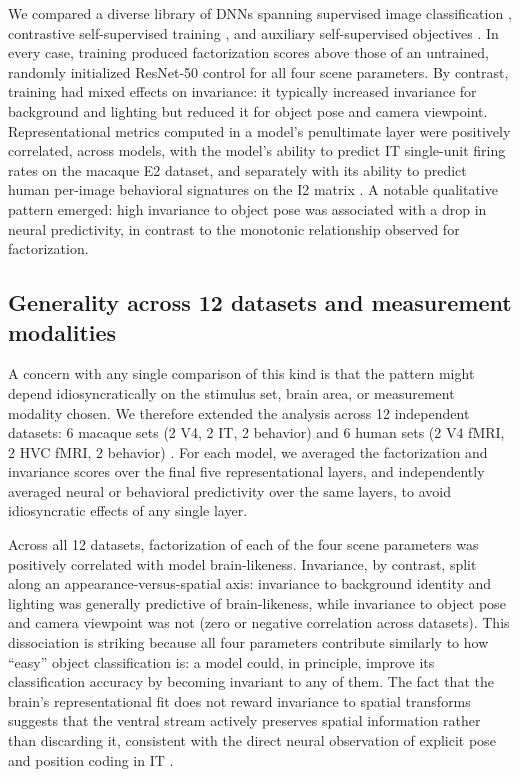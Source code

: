\documentclass[11pt]{article}
\begin{document}
We compared a diverse library of DNNs spanning supervised image
classification \citep{krizhevsky2012imagenet, he2016deep}, contrastive
self-supervised training \citep{chen2020simple, he2020momentum}, and
auxiliary self-supervised objectives \citep{zhuang2021unsupervised}. In
every case, training produced factorization scores above those of an
untrained, randomly initialized ResNet-50 control for all four scene
parameters. By contrast, training had mixed effects on invariance: it
typically increased invariance for background and lighting but reduced it
for object pose and camera viewpoint. Representational metrics computed in
a model's penultimate layer were positively correlated, across models, with
the model's ability to predict IT single-unit firing rates on the macaque E2
dataset, and separately with its ability to predict human per-image
behavioral signatures on the I2 matrix
\citep{rajalingham2018large}. A notable qualitative pattern emerged: high
invariance to object pose was associated with a drop in neural predictivity,
in contrast to the monotonic relationship observed for factorization.

\subsection{Generality across 12 datasets and measurement modalities}

A concern with any single comparison of this kind is that the pattern might
depend idiosyncratically on the stimulus set, brain area, or measurement
modality chosen. We therefore extended the analysis across 12 independent
datasets: 6 macaque sets (2 V4, 2 IT, 2 behavior) and 6 human sets (2 V4
fMRI, 2 HVC fMRI, 2 behavior)
\citep{majaj2015simple, hong2016explicit, rajalingham2018large,
khalighrazavi2014deep}. For each model, we averaged the factorization and
invariance scores over the final five representational layers, and
independently averaged neural or behavioral predictivity over the same
layers, to avoid idiosyncratic effects of any single layer.

Across all 12 datasets, factorization of each of the four scene parameters
was positively correlated with model brain-likeness. Invariance, by contrast,
split along an appearance-versus-spatial axis: invariance to background
identity and lighting was generally predictive of brain-likeness, while
invariance to object pose and camera viewpoint was not (zero or negative
correlation across datasets). This dissociation is striking because all
four parameters contribute similarly to how ``easy'' object classification
is: a model could, in principle, improve its classification accuracy by
becoming invariant to any of them. The fact that the brain's
representational fit does not reward invariance to spatial transforms
suggests that the ventral stream actively preserves spatial information
rather than discarding it, consistent with the direct neural observation of
explicit pose and position coding in IT \citep{hong2016explicit}.
\end{document}
